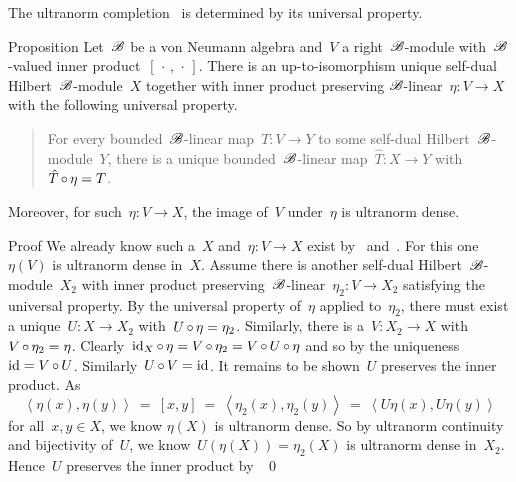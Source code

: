 \documentclass[b]{subfiles}
\begin{document}
\begin{parsec}%
\begin{point}%
The ultranorm completion~
    is determined by its universal property.
\end{point}
\begin{point}{Proposition}%
Let~$\mathscr{B}$ be a von Neumann algebra and~$V$ a right~$\mathscr{B}$-module
    with~$\mathscr{B}$-valued inner product~$[\,\cdot\,,\,\cdot\,]$.
There is an up-to-isomorphism unique
    self-dual Hilbert~$\mathscr{B}$-module~$X$
    together with inner product preserving $\mathscr{B}$-linear~$\eta \colon V \to X$
    with the following universal property.
    \begin{quote}
    For every bounded~$\mathscr{B}$-linear map~$T\colon V \to Y$
    to some self-dual Hilbert~$\mathscr{B}$-module~$Y$,
    there is a unique bounded~$\mathscr{B}$-linear map~$\hat{T}\colon X \to Y$
    with~$\hat{T} \mathop{\circ} \eta = T$.
    \end{quote}
Moreover, for such~$\eta\colon V \to X$,
    the image of~$V$ under~$\eta$ is ultranorm dense.
\begin{point}{Proof}%
We already know such a~$X$ and~$\eta\colon V \to X$
    exist by~
    and~.
For this one~$\eta(V)$ is ultranorm dense in~$X$.
Assume there is another self-dual Hilbert~$\mathscr{B}$-module~$X_2$
    with inner product preserving~$\mathscr{B}$-linear~$\eta_2\colon V \to X_2$
    satisfying the universal property.
By the universal property of~$\eta$ applied to~$\eta_2$,
    there must exist a unique~$U \colon X  \to X_2$
    with~$U \mathop{\circ} \eta  = \eta_2$.
Similarly, there is a~$V \colon X_2 \to X$
    with~$V \mathop{\circ} \eta_2 = \eta$.
Clearly~$\operatorname{id}_{X} \mathop{\circ} \eta = V \mathop{\circ} \eta_2 = V \mathop{\circ} U \mathop{\circ} \eta$
    and so by the uniqueness~$\operatorname{id} = V\mathop{\circ} U$.
    Similarly~$U \mathop{\circ} V = \operatorname{id}$.
It remains to be shown~$U$ preserves the inner product.
As
\begin{equation*}
    \left<\eta(x),\eta(y)\right>
    \ =\  [x,y]
    \ =\  \left<\eta_2(x), \eta_2(y)\right>
    \ =\  \left<U \eta(x), U \eta(y)\right>
\end{equation*}
for all~$x,y \in X$, we know
$\eta(X)$ is ultranorm dense.
So by ultranorm continuity and bijectivity of~$U$,
    we know~$U(\eta(X)) = \eta_2(X)$ is ultranorm dense in~$X_2$.
Hence~$U$ preserves the inner product by~
\qed
\end{point}
\end{point}
\end{parsec}
\end{document}
